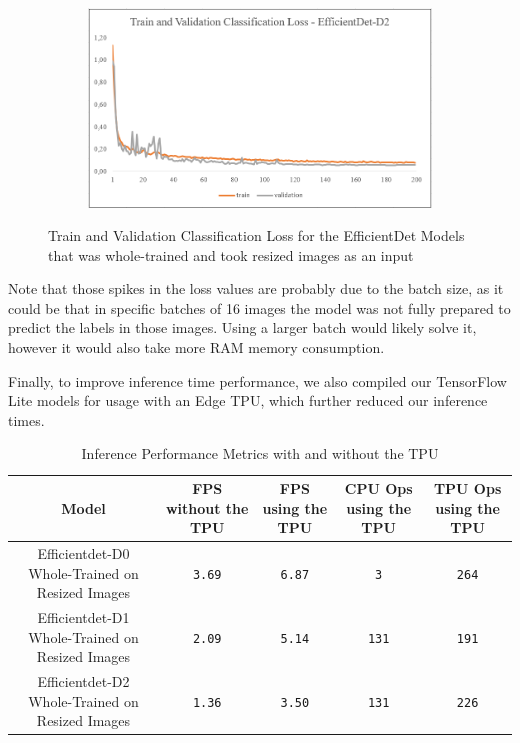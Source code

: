 \documentclass[openright]{normas-utf-tex} %
\begin{document}
\begin{figure}[H]
\begin{subfigure}{0.65\textwidth}
        \caption{}
    \end{subfigure}
    \begin{subfigure}{0.65\textwidth}
        \centering
        \includegraphics[width=1\textwidth]{./images/efficientdet-d2-resized-whole-loss.png}
        \caption{}
    \end{subfigure}
	\caption[Train and Validation Classification Loss for the EfficientDet Models that 
		was whole-trained and took resized images as an input]{Train and Validation Classification Loss 
		for the EfficientDet Models that was whole-trained and took resized images as an input}
    \label{fig:training}
\end{figure}

Note that those spikes in the loss values are probably due to the batch size, as it could be 
that in specific batches of 16 images the model was not fully prepared to predict the labels
in those images. Using a larger batch would likely solve it, however it would also take more RAM
memory consumption. 

Finally, to improve inference time performance, we also compiled our TensorFlow Lite models for 
usage with an Edge TPU, which further reduced our inference times. 

\begin{table}[H]
	\centering
	\begin{adjustbox}{width=1\textwidth}
	\label{tab:modelPerformance}
	\begin{tabular}{c|c|c|c|c}
		\hline 
		Model & FPS without the TPU & FPS using the TPU & CPU Ops using the TPU & TPU Ops using the TPU\\
		\hline
        Efficientdet-D0 Whole-Trained on Resized Images & \texttt{3.69} & \texttt{6.87} & \texttt{3} & \texttt{264}\\
		Efficientdet-D1 Whole-Trained on Resized Images & \texttt{2.09} & \texttt{5.14} & \texttt{131} & \texttt{191}\\
		Efficientdet-D2 Whole-Trained on Resized Images & \texttt{1.36} & \texttt{3.50} & \texttt{131} & \texttt{226}\\ 
		\hline 
	\end{tabular}
	\end{adjustbox}
	\caption[Inference Performance Metrics with and without the TPU]{Inference Performance Metrics with and without the TPU}
\end{table}
\end{document}
